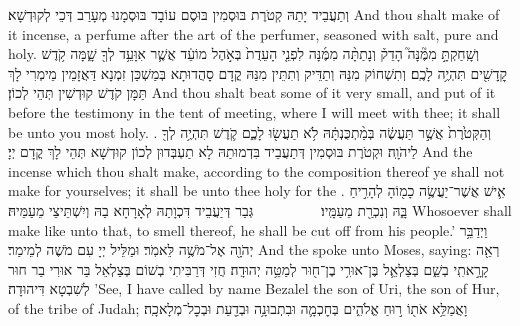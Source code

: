 {וְתַעֲבֵיד יָתַהּ קְטֹרֶת בּוּסְמִין בּוּסֶם עוֹבָד בּוּסְמָנוּ מְעָרַב דְּכֵי לְקוּדְשָׁא׃}
{And thou shalt make of it incense, a perfume after the art of the perfumer, seasoned with salt, pure and holy.}{}
{וְשָֽׁחַקְתָּ֣ מִמֶּ֘נָּה֮ הָדֵק֒ וְנָתַתָּ֨ה מִמֶּ֜נָּה לִפְנֵ֤י הָעֵדֻת֙ בְּאֹ֣הֶל מוֹעֵ֔ד אֲשֶׁ֛ר אִוָּעֵ֥ד לְךָ֖ שָׁ֑מָּה קֹ֥דֶשׁ קׇֽדָשִׁ֖ים תִּהְיֶ֥ה לָכֶֽם׃
}
{וְתִשְׁחוֹק מִנַּהּ וְתַדֵּיק וְתִתֵּין מִנַּהּ קֳדָם סָהֲדוּתָא בְּמַשְׁכַּן זִמְנָא דַּאֲזָמֵין מֵימְרִי לָךְ תַּמָּן קֹדֶשׁ קוּדְשִׁין תְּהֵי לְכוֹן׃}
{And thou shalt beat some of it very small, and put of it before the testimony in the tent of meeting, where I will meet with thee; it shall be unto you most holy. .}{}
{וְהַקְּטֹ֙רֶת֙ אֲשֶׁ֣ר תַּעֲשֶׂ֔ה בְּמַ֨תְכֻּנְתָּ֔הּ לֹ֥א תַעֲשׂ֖וּ לָכֶ֑ם קֹ֛דֶשׁ תִּהְיֶ֥ה לְךָ֖ לַיהֹוָֽה׃
}
{וּקְטֹרֶת בּוּסְמִין דְּתַעֲבֵיד בִּדְמוּתַהּ לָא תַעְבְּדוּן לְכוֹן קוּדְשָׁא תְּהֵי לָךְ קֳדָם יְיָ׃}
{And the incense which thou shalt make, according to the composition thereof ye shall not make for yourselves; it shall be unto thee holy for the \lord.}{}
{אִ֛ישׁ אֲשֶׁר־יַעֲשֶׂ֥ה כָמ֖וֹהָ לְהָרִ֣יחַ בָּ֑הּ וְנִכְרַ֖ת מֵעַמָּֽיו׃ \setuma         
}
{גְּבַר דְּיַעֲבֵיד דִּכְוָתַהּ לְאָרָחָא בַהּ וְיִשְׁתֵּיצֵי מֵעַמֵּיהּ׃}
{Whosoever shall make like unto that, to smell thereof, he shall be cut off from his people.’}{}
\newperek
{}%
{וַיְדַבֵּ֥ר יְהֹוָ֖ה אֶל־מֹשֶׁ֥ה לֵּאמֹֽר׃}
{וּמַלֵּיל יְיָ עִם מֹשֶׁה לְמֵימַר׃}
{And the \lord\space spoke unto Moses, saying:}{}
{רְאֵ֖ה קָרָ֣אתִֽי בְשֵׁ֑ם בְּצַלְאֵ֛ל בֶּן־אוּרִ֥י בֶן־ח֖וּר לְמַטֵּ֥ה יְהוּדָֽה׃
}
{חֲזִי דְּרַבִּיתִי בְשׁוֹם בְּצַלְאֵל בַּר אוּרִי בַר חוּר לְשִׁבְטָא דִּיהוּדָה׃}
{’See, I have called by name Bezalel the son of Uri, the son of Hur, of the tribe of Judah;}{}
{וָאֲמַלֵּ֥א אֹת֖וֹ ר֣וּחַ אֱלֹהִ֑ים בְּחׇכְמָ֛ה וּבִתְבוּנָ֥ה וּבְדַ֖עַת וּבְכׇל־מְלָאכָֽה׃
}
